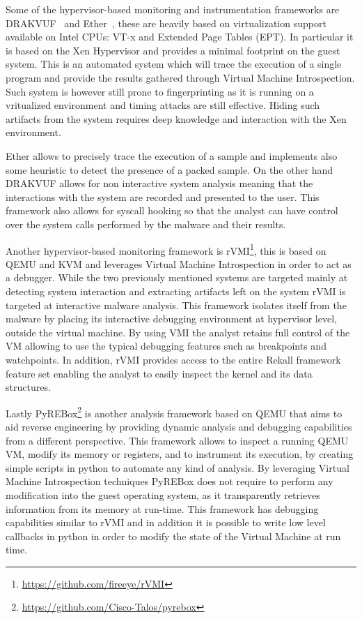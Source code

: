 Some of the hypervisor-based monitoring and instrumentation frameworks are DRAKVUF~\cite{lengyel2014drakvuf} and Ether~\cite{ether}, these are heavily based on virtualization support available on Intel CPUs: VT-x and Extended Page Tables (EPT). In particular it is based on the Xen Hypervisor and provides a minimal footprint on the guest system. This is an automated system which will trace the execution of a single program and provide the results gathered through Virtual Machine Introspection. Such system is however still prone to fingerprinting as it is running on a vritualized environment and timing attacks are still effective. Hiding such artifacts from the system requires deep knowledge and interaction with the Xen environment. 

Ether allows to precisely trace the execution of a sample and implements also some heuristic to detect the presence of a packed sample. On the other hand DRAKVUF allows for non interactive system analysis meaning that the interactions with the system are recorded and presented to the user. This framework also allows for syscall hooking so that the analyst can have control over the system calls performed by the malware and their results. 

Another hypervisor-based monitoring framework is rVMI\footnote{\url{https://github.com/fireeye/rVMI}}, this is based on QEMU and KVM and leverages Virtual Machine Introspection in order to act as a debugger. While the two previously mentioned systems are targeted mainly at detecting system interaction and extracting artifacts left on the system rVMI is targeted at interactive malware analysis. This framework isolates itself from the malware by placing its interactive debugging environment at hypervisor level, outside the virtual machine. By using VMI the analyst retains full control of the VM allowing to use the typical debugging features such as breakpoints and watchpoints. In addition, rVMI provides access to the entire Rekall framework feature set enabling the analyst to easily inspect the kernel and its data structures.

Lastly PyREBox\footnote{\url{https://github.com/Cisco-Talos/pyrebox}} is another analysis framework based on QEMU that aims to aid reverse engineering by providing dynamic analysis and debugging capabilities from a different perspective. This framework allows to inspect a running QEMU VM, modify its memory or registers, and to instrument its execution, by creating simple scripts in python to automate any kind of analysis. By leveraging Virtual Machine Introspection techniques PyREBox does not require to perform any modification into the guest operating system, as it transparently retrieves information from its memory at run-time. This framework has debugging capabilities similar to rVMI and in addition it is possible to write low level callbacks in python in order to modify the state of the Virtual Machine at run time. 

